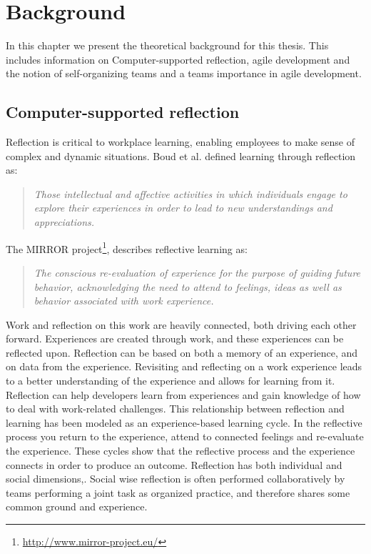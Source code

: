 \chapter{Background}
\label{chap:background}
In this chapter we present the theoretical background for this thesis. This includes information on Computer-supported reflection, agile development and the notion of self-organizing teams and a teams importance in agile development. 

\section{Computer-supported reflection}
Reflection is critical to workplace learning, enabling employees to make sense of complex and dynamic situations\citep{Schon1983}. Boud et al.\citep{boudreflection1985} defined learning through reflection as: 
\begin{quote}
\emph{Those intellectual and affective activities in which individuals engage to explore their experiences in order to lead to new understandings and appreciations.}
\end{quote}
The MIRROR project\footnote{\url{http://www.mirror-project.eu/}}, describes reflective learning as:
\begin{quote}
\emph{The conscious re-evaluation of experience for the purpose of guiding future behavior, acknowledging the need to attend to feelings, ideas as well as behavior associated with work experience.}\citep{krogstiemodel}
\end{quote}

Work and reflection on this work are heavily connected\citep{Schon1983}, both driving each other forward. Experiences are created through work, and these experiences can be reflected upon. Reflection can be based on both a memory of an experience, and on data from the experience. Revisiting and reflecting on a work experience leads to a better understanding of the experience and allows for learning from it. Reflection can help developers learn from experiences and gain knowledge of how to deal with work-related challenges. This relationship between reflection and learning has been modeled as an experience-based learning cycle\citep{boudreflection1985,Korthagen_Vasalos_2005, KolbModel}. In the reflective process you return to the experience, attend to connected feelings and re-evaluate
the experience. These cycles show that the reflective process and the experience connects in order to produce an outcome.
Reflection has both individual and social dimensions,\citep{Hoeyrup_2004,Woerkom_Croon_2008}. Social wise reflection is often performed collaboratively by teams performing a joint task as organized practice, and therefore shares some common ground and experience. 

